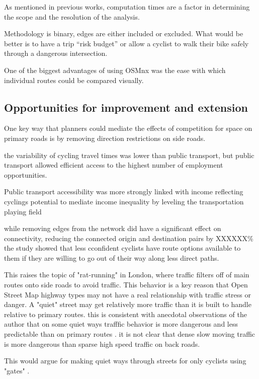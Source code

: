 As mentioned in previous works, computation times are a factor in determining the scope and the resolution of the analysis. 

Methodology is binary, edges are either included or excluded. What would be better is to have a trip ``risk budget''  or allow a cyclist to walk their bike safely through a dangerous intersection. 

One of the biggest advantages of using OSMnx was the ease with which individual routes could be compared visually. 

\subsection{Opportunities for improvement and extension}


One key way that planners could mediate the effects of competition for space on primary roads is by removing direction restrictions on side roads. 

the variability of cycling travel times was lower than public transport, but public transport allowed efficient access to the highest number of employment opportunities. 


Public transport accessibility was more strongly linked with income reflecting cyclings potential to mediate income inequality by leveling the transportation playing field

while removing edges from the network did have a significant effect on connectivity, reducing the connected origin and destination pairs by XXXXXX\% the study showed that less cconfident cyclists have route options available to them if they are willing to go out of their way along less direct paths. 


This raises the topic of "rat-running" in London, where traffic filters off of main routes onto side roads to avoid traffic. This behavior is a key reason that Open Street Map highway types may not have a real relationship with traffic stress or danger. A "quiet" street may get relatively more traffic than it is built to handle relative to primary routes. this is consistent with anecdotal observations of the author that on some quiet ways trafffic behavior is more dangerous and less predictable than on primary routes . it is not clear that dense slow moving traffic is more dangerous than sparse high speed traffic on back roads. 

This would argue for making quiet ways through streets for only cyclists using "gates" .